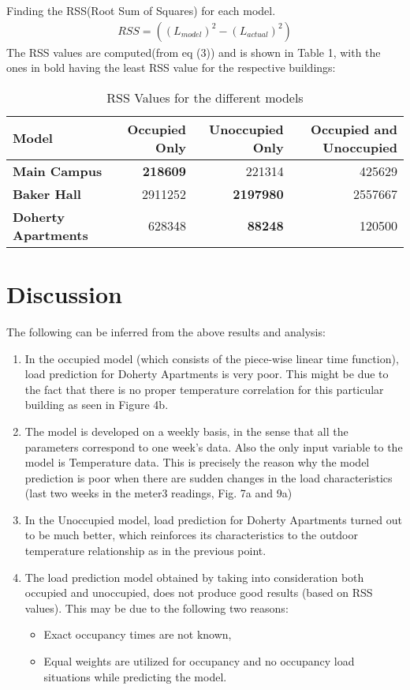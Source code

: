 \documentclass[a4paper,11pt]{article}
\begin{document}
Finding the RSS(Root Sum of Squares) for each model.
\begin{align}
RSS=((L_{model})^2 - (L_{actual})^2)
\end{align}
The RSS values are computed(from eq (3)) and is shown in Table 1, with the ones in bold having the least RSS value for the respective buildings:

\begin{table}[H]
  \centering
  \caption{RSS Values for the different models}
    \begin{tabular}{lrrr}
    \toprule
    \textbf{Model} & \textbf{Occupied Only} & \textbf{Unoccupied Only} & \textbf{Occupied and Unoccupied} \\
    \midrule
    \textbf{Main Campus} & \textbf{218609} & 221314 & 425629 \\
    \textbf{Baker Hall} & 2911252 & \textbf{2197980} & 2557667 \\
    \textbf{Doherty Apartments} & 628348 & \textbf{88248} & 120500 \\
    \bottomrule
    \end{tabular}%
  \label{tab:addlabel}%
\end{table}%


\section{Discussion}
The following can be inferred from the above results and analysis:
\begin{enumerate}
\itemsep0em
\item In the occupied model (which consists of the piece-wise linear time function), load prediction for Doherty Apartments is very poor. This might be due to the fact that there is no proper temperature correlation for this particular building as seen in Figure 4b.
\item The model is developed on a weekly basis, in the sense that all the parameters correspond to one week's data. Also the only input variable to the model is Temperature data. This is precisely the reason why the model prediction is poor when there are sudden changes in the load characteristics (last two weeks in the meter3 readings, Fig. 7a and 9a)
\item In the Unoccupied model, load prediction for Doherty Apartments turned out to be much better, which reinforces its characteristics to the outdoor temperature relationship as in the previous point. 
\item The load prediction model obtained by taking into consideration both occupied and unoccupied, does not produce good results (based on RSS values). This may be due to the following two reasons:
\begin{itemize}
\itemsep0em
\item Exact occupancy times are not known,
\item Equal weights are utilized for occupancy and  no occupancy load situations while predicting the model.
\end{itemize}
\end{enumerate}
\end{document}
